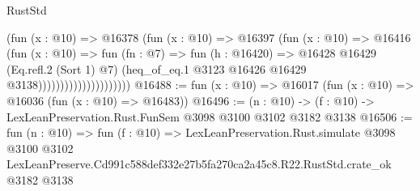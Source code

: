 \begin{lexlean}{RustStd}
\begin{coremodule}
                                    (fun (x : @10) =>
                                    @16378
                                      (fun (x : @10) =>
                                      @16397
                                        (fun (x : @10) =>
                                        @16416
                                          (fun (x : @10) =>
                                          fun (fn : @7) =>
                                          fun (h : @16420) =>
                                          @16428
                                            @16429
                                            (Eq.refl.{2} (Sort 1) @7)
                                            (heq_of_eq.{1}
                                              @3123
                                              @16426
                                              @16429
                                              @3138)))))))))))))))))))))
@16488 := fun (x : @10) => @16017 (fun (x : @10) => @16036 (fun (x : @10) => @16483))
@16496 := (n : @10) -> (f : @10) -> LexLeanPreservation.Rust.FunSem @3098 @3100 @3102 @3182 @3138
@16506 := fun (n : @10) =>
  fun (f : @10) =>
  LexLeanPreservation.Rust.simulate
    @3098
    @3100
    @3102
    LexLeanPreserve.Cd991c588def332e27b5fa270ca2a45c8.R22.RustStd.crate_ok
    @3182
    @3138
\end{coremodule}
\end{lexlean}
